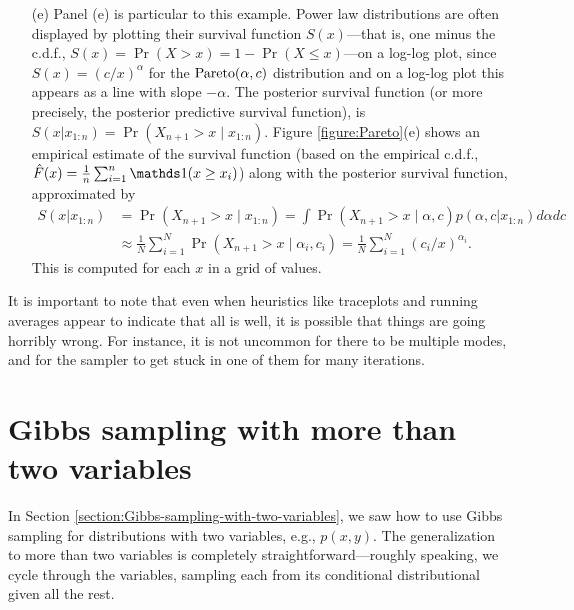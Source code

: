 \documentclass[12pt]{article}
\begin{document}
\begin{itemize}
\item[(e)] Panel (e) is particular to this example. Power law distributions are often displayed by plotting their survival function $S(x)$---that is, one minus the c.d.f., $S(x) = \Pr(X>x) = 1-\Pr(X\leq x)$---on a log-log plot, since $S(x) = (c/x)^\alpha$ for the $\operatorname*{Pareto}(\alpha,c)$ distribution and on a log-log plot this appears as a line with slope $-\alpha$. The posterior survival function (or more precisely, the posterior predictive survival function), is $S(x|x_{1:n}) = \Pr(X_{n+1}>x\mid x_{1:n})$. Figure \ref{figure:Pareto}(e) shows an empirical estimate of the survival function (based on the empirical c.d.f., $\hat F(x) = \frac{1}{n}\sum_{i = 1}^n \I(x\geq x_i)$) along with the posterior survival function, approximated by
\begin{align*}
S(x|x_{1:n}) &= \Pr(X_{n+1}>x\mid x_{1:n}) = \int \Pr(X_{n+1}>x\mid \alpha,c) p(\alpha,c|x_{1:n})d\alpha d c\\
&\approx\frac{1}{N}\sum_{i = 1}^N \Pr(X_{n+1}>x\mid \alpha_i,c_i)
=\frac{1}{N}\sum_{i = 1}^N (c_i/x)^{\alpha_i}.
\end{align*}
This is computed for each $x$ in a grid of values.
\end{itemize}
It is important to note that even when heuristics like traceplots and running averages appear to indicate that all is well, it is possible that things are going horribly wrong. For instance, it is not uncommon for there to be multiple modes, and for the sampler to get stuck in one of them for many iterations.











\section{Gibbs sampling with more than two variables}

In Section \ref{section:Gibbs-sampling-with-two-variables}, we saw how to use Gibbs sampling for distributions with two variables, e.g., $p(x,y)$. The generalization to more than two variables is completely straightforward---roughly speaking, we cycle through the variables, sampling each from its conditional distributional given all the rest.
\end{document}
